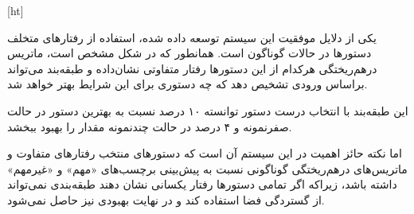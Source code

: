 [ht]

یکی از دلایل موفقیت این سیستم توسعه داده شده، استفاده از رفتارهای متخلف دستورها در حالات گوناگون است. همانطور که در شکل  مشخص است، ماتریس درهم‌ریختگی هرکدام از این دستورها رفتار متفاوتی نشان‌داده و طبقه‌بند می‌تواند براساس ورودی تشخیص دهد که چه دستوری برای این شرایط بهتر خواهد شد.

این طبقه‌بند با انتخاب درست دستور توانسته ۱۰ درصد نسبت به بهترین دستور در حالت صفر‌نمونه و ۴ درصد در حالت چند‌نمونه مقدار
را بهبود ببخشد.

اما نکته حائز اهمیت در این سیستم آن است که دستورهای منتخب رفتارهای متفاوت و ماتریس‌های درهم‌ریختگی گوناگونی نسبت به پیش‌بینی برچسب‌های «مهم» و «غیرمهم» داشته باشد، زیراکه اگر تمامی دستورها رفتار یکسانی نشان دهند طبقه‌بندی نمی‌تواند از گستردگی فضا استفاده کند و در نهایت بهبودی نیز حاصل نمی‌شود.

